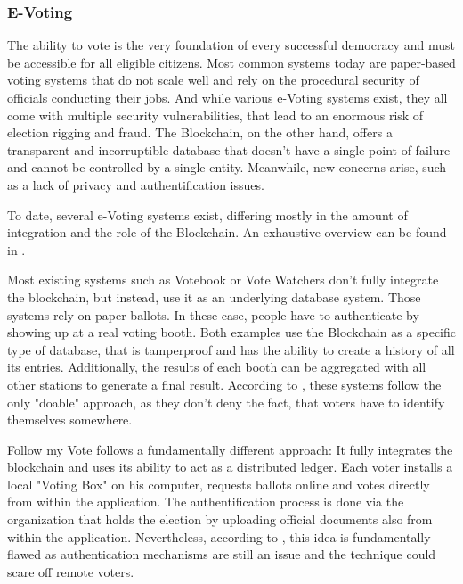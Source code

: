 \subsubsection{E-Voting}
\label{subsec:03_applications_evoting}
The ability to vote is the very foundation of every successful democracy and must be accessible for all eligible citizens. Most common systems today are paper-based voting systems that do not scale well and rely on the procedural security of officials conducting their jobs. And while various e-Voting systems exist, they all come with multiple security vulnerabilities, that lead to an enormous risk of election rigging and fraud.
The Blockchain, on the other hand, offers a transparent and incorruptible database that doesn't have a single point of failure and cannot be controlled by a single entity. Meanwhile, new concerns arise, such as a lack of privacy and authentification issues.

To date, several e-Voting systems exist, differing mostly in the amount of integration and the role of the Blockchain. An exhaustive overview can be found in  \cite{BenAyed2017}.

Most existing systems such as Votebook \cite{Kirby2016} or Vote Watchers \cite{BlockchainTechnologiesCorporation} don't fully integrate the blockchain, but instead, use it as an underlying database system. Those systems rely on paper ballots. In these case, people have to authenticate by showing up at a real voting booth. Both examples use the Blockchain as a specific type of database, that is tamperproof and has the ability to create a history of all its entries. Additionally, the results of each booth can be aggregated with all other stations to generate a final result\cite{BenAyed2017}.
According to \citeauthor{Osgood2016}, these systems follow the only "doable" approach, as they don't deny the fact, that voters have to identify themselves somewhere.

Follow my Vote \cite{FollowMyVote} follows a fundamentally different approach: It fully integrates the blockchain and uses its ability to act as a distributed ledger. Each voter installs a local "Voting Box" on his computer, requests ballots online and votes directly from within the application. The authentification process is done via the organization that holds the election by uploading official documents also from within the application. Nevertheless, according to \citeauthor{Osgood2016}, this idea is fundamentally flawed as authentication mechanisms are still an issue and the technique could scare off remote voters.

